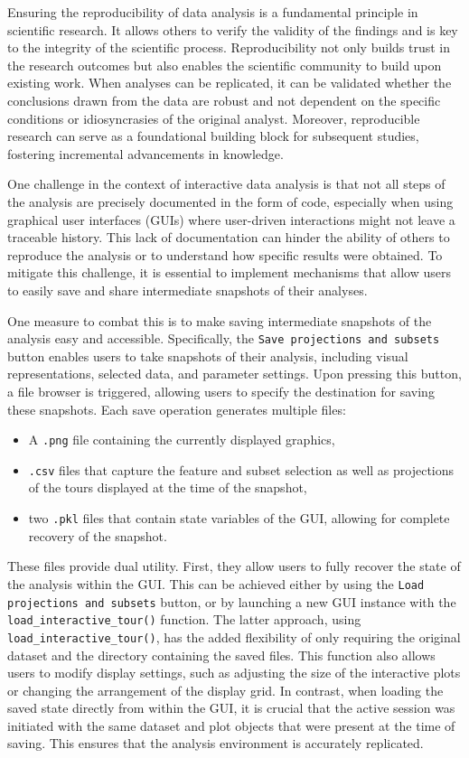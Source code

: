 \documentclass[article]{ajs}
\begin{document}
Ensuring the reproducibility of data analysis is a fundamental principle in scientific research. It allows others to verify the validity of the findings and is key to the integrity of the scientific process. Reproducibility not only builds trust in the research outcomes but also enables the scientific community to build upon existing work. When analyses can be replicated, it can be validated whether the conclusions drawn from the data are robust and not dependent on the specific conditions or idiosyncrasies of the original analyst. Moreover, reproducible research can serve as a foundational building block for subsequent studies, fostering incremental advancements in knowledge.

One challenge in the context of interactive data analysis is that not all steps of the analysis are precisely documented in the form of code, especially when using graphical user interfaces (GUIs) where user-driven interactions might not leave a traceable history. This lack of documentation can hinder the ability of others to reproduce the analysis or to understand how specific results were obtained. To mitigate this challenge, it is essential to implement mechanisms that allow users to easily save and share intermediate snapshots of their analyses.

One measure to combat this is to make saving intermediate snapshots of the analysis easy and accessible. Specifically, the \texttt{Save projections and subsets} button enables users to take snapshots of their analysis, including visual representations, selected data, and parameter settings. Upon pressing this button, a file browser is triggered, allowing users to specify the destination for saving these snapshots. Each save operation generates multiple files:


\begin{itemize}
    \item A \texttt{.png} file containing the currently displayed graphics,
    \item \texttt{.csv} files that capture the feature and subset selection as well as projections of the tours displayed at the time of the snapshot,
    \item two \texttt{.pkl} files that contain state variables of the GUI, allowing for complete recovery of the snapshot.
\end{itemize}

These files provide dual utility. First, they allow users to fully recover the state of the analysis within the GUI. This can be achieved either by using the \texttt{Load projections and subsets} button, or by launching a new GUI instance with the \texttt{load\_interactive\_tour()} function. The latter approach, using \texttt{load\_interactive\_tour()}, has the added flexibility of only requiring the original dataset and the directory containing the saved files. This function also allows users to modify display settings, such as adjusting the size of the interactive plots or changing the arrangement of the display grid. In contrast, when loading the saved state directly from within the GUI, it is crucial that the active session was initiated with the same dataset and plot objects that were present at the time of saving. This ensures that the analysis environment is accurately replicated.
\end{document}
